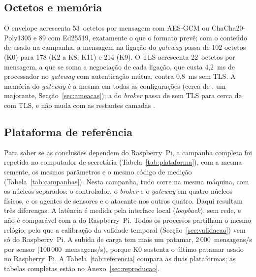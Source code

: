 \subsection{Octetos e memória}

O envelope acrescenta 53~octetos por mensagem com AES-GCM ou ChaCha20-Poly1305 e
89 com Ed25519, exatamente o que o formato prevê; com o conteúdo de 
usado na campanha, a mensagem na ligação do \emph{gateway} passa de 102 octetos
(K0) para 178 (K2 a K8, K11) e 214 (K9). O TLS acrescenta 22~octetos por
mensagem, a que se soma a negociação de cada ligação, que custa 4,2~ms de
processador no \emph{gateway} com autenticação mútua, contra 0,8~ms sem TLS. A
memória do \emph{gateway} é a mesma em todas as configurações (cerca de , um
majorante, Secção~\ref{sec:ameacas}); a do \emph{broker} passa de  sem TLS
para cerca de  com TLS, e não muda com as restantes camadas .

\subsection{Plataforma de referência}
\label{sec:referencia}

Para saber se as conclusões dependem do Raspberry~Pi, a campanha completa foi
repetida no computador de secretária (Tabela~\ref{tab:plataforma}), com a mesma
semente, os mesmos parâmetros e o mesmo código de medição
(Tabela~\ref{tab:campanhas}). Nesta campanha, tudo corre na mesma máquina, com os
núcleos separados: o controlador, o \emph{broker} e o \emph{gateway} em quatro
núcleos físicos, e os agentes de sensores e o atacante nos outros quatro. Daqui
resultam três diferenças. A latência é medida pela interface local
(\emph{loopback}), sem rede, e não é comparável com a do Raspberry~Pi. Todos os
processos partilham o mesmo relógio, pelo que a calibração da validade temporal
(Secção~\ref{sec:validacao}) vem só do Raspberry~Pi. A subida de carga tem mais um
patamar, 2\,000~mensagens/s por sensor (100\,000~mensagens/s), porque K0 sustenta o
último patamar usado no Raspberry~Pi. A Tabela~\ref{tab:referencia} compara as duas
plataformas; as tabelas completas estão no Anexo~\ref{sec:reproducao}.

